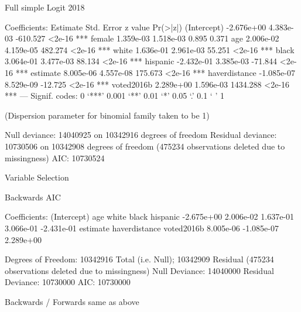 Full simple Logit 2018

Coefficients:
                Estimate Std. Error  z value Pr(>|z|)
(Intercept)   -2.676e+00  4.383e-03 -610.527   <2e-16 ***
female         1.359e-03  1.518e-03    0.895    0.371
age            2.006e-02  4.159e-05  482.274   <2e-16 ***
white          1.636e-01  2.961e-03   55.251   <2e-16 ***
black          3.064e-01  3.477e-03   88.134   <2e-16 ***
hispanic      -2.432e-01  3.385e-03  -71.844   <2e-16 ***
estimate       8.005e-06  4.557e-08  175.673   <2e-16 ***
haverdistance -1.085e-07  8.529e-09  -12.725   <2e-16 ***
voted2016b     2.289e+00  1.596e-03 1434.288   <2e-16 ***
---
Signif. codes:  0 ‘***’ 0.001 ‘**’ 0.01 ‘*’ 0.05 ‘.’ 0.1 ‘ ’ 1

(Dispersion parameter for binomial family taken to be 1)

    Null deviance: 14040925  on 10342916  degrees of freedom
Residual deviance: 10730506  on 10342908  degrees of freedom
  (475234 observations deleted due to missingness)
AIC: 10730524





Variable Selection

Backwards AIC

Coefficients:
  (Intercept)            age          white          black       hispanic
   -2.675e+00      2.006e-02      1.637e-01      3.066e-01     -2.431e-01
     estimate  haverdistance     voted2016b
    8.005e-06     -1.085e-07      2.289e+00

Degrees of Freedom: 10342916 Total (i.e. Null);  10342909 Residual
  (475234 observations deleted due to missingness)
Null Deviance:	    14040000
Residual Deviance: 10730000 	AIC: 10730000

Backwards / Forwards same as above
